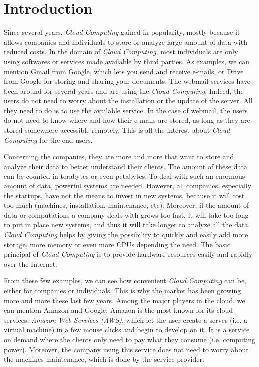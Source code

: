 

\chapter{Introduction}
Since several years, \textit{Cloud Computing} gained in popularity, mostly because it allows companies and individuals to store or analyze large amount of data with reduced costs. 
In the domain of \textit{Cloud Computing}, most individuals are only using softwares or services made available by third parties. 
As examples, we can mention Gmail from Google, which lets you send and receive e-mails, or Drive from Google for storing and sharing your documents. 
The webmail services have been around for several years and are using the \textit{Cloud Computing}. 
Indeed, the users do not need to worry about the installation or the update of the server. 
All they need to do is to use the available service. In the case of webmail, the users do not need to know where and how their e-mails are stored, as long as they are stored somewhere accessible remotely. This is all the interest about \textit{Cloud Computing} for the end users.

Concerning the companies, they are more and more that want to store and analyze their data to better understand their clients. 
The amount of these data can be counted in terabytes or even petabytes. 
To deal with such an enormous amount of data, powerful systems are needed. 
However, all companies, especially the startups, have not the means to invest in new systems, because it will cost too much (machines, installation, maintenance, etc). 
Moreover, if the amount of data or computations a company deals with grows too fast, it will take too long to put in place new systems, and thus it will take longer to analyze all the data. 
\textit{Cloud Computing} helps by giving the possibility to quickly and easily add more storage, more memory or even more CPUs depending the need. 
The basic principal of \textit{Cloud Computing} is to provide hardware resources easily and rapidly over the Internet.

From these few examples, we can see how convenient \textit{Cloud Computing} can be, either for companies or individuals. 
This is why the market has been growing more and more these last few years. 
Among the major players in the cloud, we can mention Amazon and Google. 
Amazon is the most known for its cloud services, \textit{Amazon Web Services (AWS)}, which let the user create a server (i.e. a virtual machine) in a few mouse clicks and begin to develop on it.  
It is a service on demand where the clients only need to pay what they consume (i.e. computing power). 
Moreover, the company using this service does not need to worry about the machines maintenance, which is done by the service provider.



